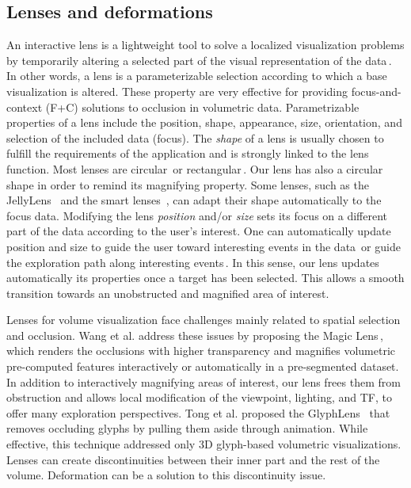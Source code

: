 \vspace{-0.15cm}
\subsection{Lenses and deformations}
%
An interactive lens is a lightweight tool to solve a localized visualization problems by temporarily altering a selected part of the visual representation of the data\,\cite{CGF:CGF12871}. In other words, a lens is a parameterizable selection according to which a base visualization is altered. These property are very effective for providing focus-and-context (F+C) solutions to occlusion in volumetric data. Parametrizable properties of a lens include the position, shape, appearance, size, orientation, and selection of the included data (focus). The \emph{shape} of a lens is usually chosen to fulfill the requirements of the application and is strongly linked to the lens function. Most lenses are circular\,\cite{1648236} or rectangular\,\cite{Kincaid:2010:SFA:1907651.1907963}. Our lens has also a circular shape in order to remind its magnifying property. Some lenses, such as the JellyLens~\cite{Pindat:2012:JCA:2380116.2380150} and the smart lenses~\cite{Thiede2008}, can adapt their shape automatically to the focus data. Modifying the lens \emph{position} and/or \emph{size} sets its focus on a different part of the data according to the user's interest. One can automatically update position and size to guide the user toward interesting events in the data\,\cite{Tominski:2011:ECU:2336207.2336211} or guide the exploration path along interesting events\,\cite{Alvina:2014:RER:2598153.2598200}. In this sense, our lens updates automatically its properties once a target has been selected. This allows a smooth transition towards an unobstructed and magnified area of interest.

Lenses for volume visualization face challenges mainly related to spatial selection and occlusion. Wang et al. address these issues by proposing the Magic Lens\,\cite{1532818}, which renders the occlusions with higher transparency and magnifies volumetric pre-computed features interactively or automatically in a pre-segmented dataset. In addition to interactively magnifying areas of interest, our lens frees them from obstruction and allows local modification of the viewpoint, lighting, and TF, to offer many exploration perspectives. Tong et al. proposed the GlyphLens~\cite{7539643} that removes occluding glyphs by pulling them aside through animation. While effective, this technique addressed only 3D glyph-based volumetric visualizations. Lenses can create discontinuities between their inner part and the rest of the volume. Deformation can be a solution to this discontinuity issue.

